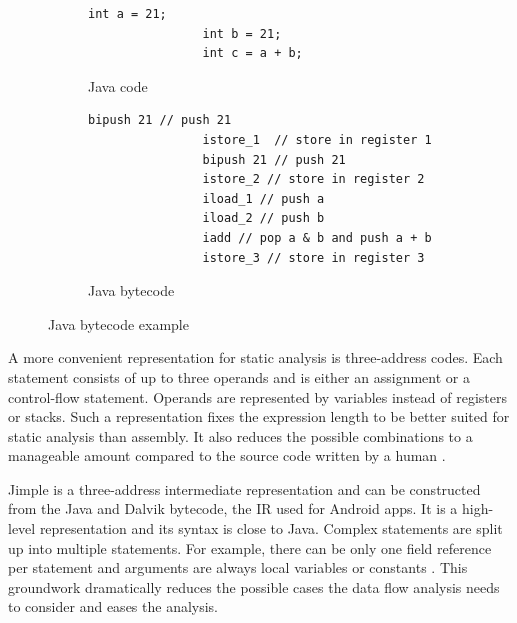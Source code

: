 \documentclass[../draft.tex]{subfiles}
\begin{document}
    \begin{figure}[ht]
        \centering
        \begin{subfigure}[b]{0.45\textwidth}
            \centering
            \begin{lstlisting}[gobble=16]
                int a = 21;
                int b = 21;
                int c = a + b;
            \end{lstlisting}
            \caption{Java code}
            \label{lst:jvmstack_a}
        \end{subfigure}
        \hfill
        \begin{subfigure}[b]{0.45\textwidth}
            \centering
            \begin{lstlisting}[gobble=16]
                bipush 21 // push 21
                istore_1  // store in register 1    
                bipush 21 // push 21
                istore_2 // store in register 2
                iload_1 // push a
                iload_2 // push b
                iadd // pop a & b and push a + b
                istore_3 // store in register 3
            \end{lstlisting}
            \caption{Java bytecode}
            \label{lst:jvmstack_b}
        \end{subfigure}
        \caption{Java bytecode example}
        \label{lst:jvmstack}
    \end{figure}

    A more convenient representation for static analysis is three-address codes. 
    Each statement consists of up to three operands and is either an assignment or a control-flow statement. 
    Operands are represented by variables instead of registers or stacks. 
    Such a representation fixes the expression length to be better suited for static analysis than assembly. It also reduces the possible combinations to a manageable amount compared to the source code written by a human \cite{Aho1986}.

    Jimple is a three-address intermediate representation and can be constructed from the Java and Dalvik bytecode, the IR used for Android apps. 
    It is a high-level representation and its syntax is close to Java. 
    Complex statements are split up into multiple statements. 
    For example, there can be only one field reference per statement and arguments are always local variables or constants \cite{Valleerai2004}. 
    This groundwork dramatically reduces the possible cases the data flow analysis needs to consider and eases the analysis.
\end{document}
